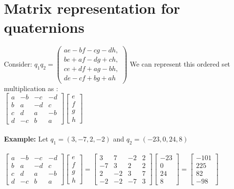 \documentclass{article}
\begin{document}
\section{Matrix representation for quaternions}
Consider: $q_1q_2=\begin{pmatrix}
ae-bf-cg-dh,\\
be+af-dg+ch,\\
ce+df+ag-bh,\\ 
de-cf+bg+ah
\end{pmatrix}$ We can represent this ordered set multiplication as : \\
$\begin{bmatrix}
a & -b & -c & -d\\
b & a & -d & c\\
c & d & a & -b\\
d & -c & b & a
\end{bmatrix}\begin{bmatrix}
e\\
f\\
g\\
h
\end{bmatrix}$\\\\
\textbf{Example: } Let $q_1= (3,-7,2,-2)$ and $q_2=(-23, 0, 24, 8)$\\\\
$\begin{bmatrix}
a & -b & -c & -d\\
b & a & -d & c\\
c & d & a & -b\\
d & -c & b & a
\end{bmatrix}\begin{bmatrix}
e\\
f\\
g\\
h
\end{bmatrix}=
\begin{bmatrix}
3 & 7 & -2 & 2\\
-7 & 3 & 2 & 2\\
2 & -2 & 3 & 7\\
-2 & -2 & -7 & 3
\end{bmatrix}\begin{bmatrix}
-23\\
0\\
24\\
8
\end{bmatrix}=
\begin{bmatrix}
-101\\
225\\
82\\
-98
\end{bmatrix}$
\end{document}
